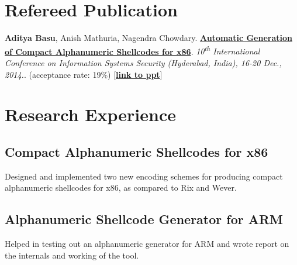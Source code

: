 \documentclass[]{deedy}
\begin{document}
\begin{minipage}[t]{0.66\textwidth}
\section{Refereed Publication}
\vspace{\topsep} %
\begin{tightemize}\item \textbf{Aditya Basu}, Anish Mathuria, Nagendra Chowdary. \href{https://dl.dropboxusercontent.com/u/9020146/resources/alpha-x86.pdf}{\textbf{Automatic Generation of Compact Alphanumeric Shellcodes for x86}}. \textit{10\textsuperscript{th} International Conference on Information Systems Security (Hyderabad, India), 16-20 Dec., 2014.}. (acceptance rate: 19\%) [\href{https://dl.dropboxusercontent.com/u/9020146/resources/ppt/alpha-x86.pdf}{\textbf{link to ppt}}]
\end{tightemize}

\section{Research Experience}
\subsection{Compact Alphanumeric Shellcodes for x86}
\begin{tightemize}
\item Designed and implemented two new encoding schemes for producing compact alphanumeric shellcodes for x86, as compared to Rix and Wever.
\end{tightemize}
\sectionsep

\subsection{Alphanumeric Shellcode Generator for ARM}
\begin{tightemize}
\item Helped in testing out an alphanumeric generator for ARM and wrote report on the internals and working of the tool.
\end{tightemize}
\sectionsep


\end{minipage}
\end{document}
